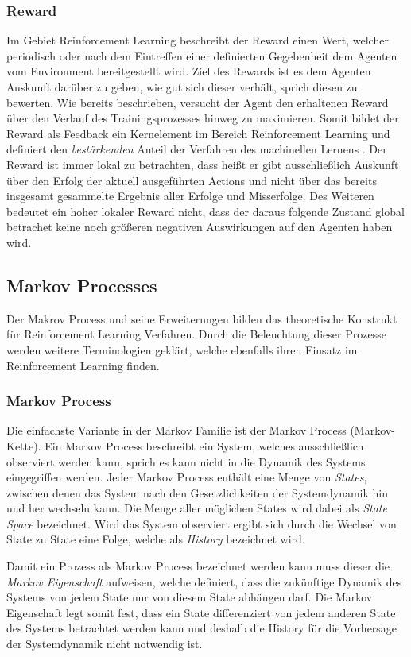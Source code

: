 \documentclass[11pt]{scrartcl}
\begin{document}
\subsubsection{Reward}
Im Gebiet Reinforcement Learning beschreibt der Reward einen Wert, welcher periodisch oder nach
dem Eintreffen einer definierten Gegebenheit dem Agenten vom Environment bereitgestellt wird.
Ziel des Rewards ist es dem Agenten Auskunft darüber zu geben, wie gut sich dieser verhält, sprich
diesen zu bewerten. Wie bereits beschrieben, versucht der Agent den erhaltenen Reward über den
Verlauf des Trainingsprozesses hinweg zu maximieren. Somit bildet der Reward als Feedback ein
Kernelement im Bereich Reinforcement Learning und definiert den \textit{bestärkenden} Anteil der 
Verfahren des machinellen Lernens \cite[~S.6 f.]{L2018}. Der Reward ist immer lokal zu betrachten,
dass heißt er gibt ausschließlich Auskunft über den Erfolg der aktuell ausgeführten Actions und
nicht über das bereits insgesamt gesammelte Ergebnis aller Erfolge und Misserfolge. Des Weiteren
bedeutet ein hoher lokaler Reward nicht, dass der daraus folgende Zustand global betrachet keine
noch größeren negativen Auswirkungen auf den Agenten haben wird.


\subsection{Markov Processes}
Der Makrov Process und seine Erweiterungen bilden das theoretische Konstrukt für Reinforcement Learning
Verfahren. Durch die Beleuchtung dieser Prozesse werden weitere Terminologien geklärt, welche ebenfalls
ihren Einsatz im Reinforcement Learning finden.


\subsubsection{Markov Process}
Die einfachste Variante in der Markov Familie ist der Markov Process (Markov-Kette). Ein Markov Process
beschreibt ein System, welches ausschließlich observiert werden kann, sprich es kann nicht in die Dynamik
des Systems eingegriffen werden. Jeder Markov Process enthält eine Menge von \textit{States}, zwischen
denen das System nach den Gesetzlichkeiten der Systemdynamik hin und her wechseln kann. Die Menge aller
möglichen States wird dabei als \textit{State Space} bezeichnet. Wird das System observiert ergibt sich
durch die Wechsel von State zu State eine Folge, welche als \textit{History} bezeichnet wird. 

Damit ein Prozess als Markov Process bezeichnet werden kann muss dieser die \textit{Markov Eigenschaft}
aufweisen, welche definiert, dass die zukünftige Dynamik des Systems von jedem State nur
von diesem State abhängen darf. Die Markov Eigenschaft legt somit fest, dass ein State
differenziert von jedem anderen State des Systems betrachtet werden kann und deshalb die
History für die Vorhersage der Systemdynamik nicht notwendig ist.
\end{document}
